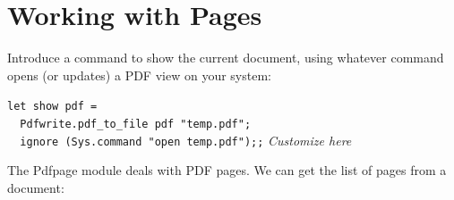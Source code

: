 \documentclass[a4paper]{memoir}
\begin{document}
\section*{Working with Pages}
Introduce a command to show the current document, using whatever command opens (or updates) a PDF view on your system:
\begin{framed}
\noindent\verb!let show pdf =!\\
\verb!  Pdfwrite.pdf_to_file pdf "temp.pdf";!\\
\verb!  ignore (Sys.command "open temp.pdf");;! \textit{Customize here}\\
\end{framed}

\noindent The \textsf{Pdfpage} module deals with PDF pages. We can get the list of pages from a document:

\clearpage
\end{document}
